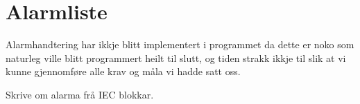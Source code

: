 \section{Alarmliste}
\thispagestyle{fancy}

Alarmhandtering har ikkje blitt implementert i programmet da dette er noko som naturleg ville blitt programmert heilt til slutt,
 og tiden strakk ikkje til slik at vi kunne gjennomføre alle krav og måla vi hadde satt oss.

 Skrive om alarma frå IEC blokkar.